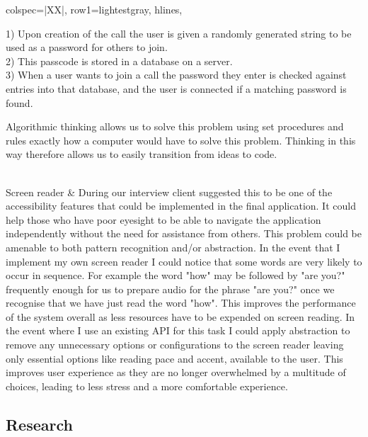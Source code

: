\begin{longtblr}[
  caption={Features and their justifications},
  label={tblr:features}
]{
  colspec={|XX|},
  row{1}={lightestgray},
  hlines,
}
{  \vspace{0.2cm}
  1) Upon creation of the call the user is given a randomly 
  generated string to be used as a password for others to 
  join.\\

  2) This passcode is stored in a database on a server.\\

  3) When a user wants to join a call the password they enter 
  is checked against entries into that database, and the user
  is connected if a matching password is found.\\
  \vspace{0.2cm}

  Algorithmic thinking allows us to solve this problem using 
  set procedures and rules exactly how a computer would have to  solve this problem. Thinking in this way therefore allows us
  to easily transition from ideas to code.}\\

  Screen reader & {During our interview client suggested this
  to be one of the accessibility features that could be
  implemented in the final application. It could help those 
  who have poor eyesight to be able to navigate the application
  independently without the need for assistance from others. 
  This problem could be amenable to both pattern recognition 
  and/or abstraction. In the event that I implement my own 
  screen reader I could notice that some words are very likely
  to occur in sequence. For example the word "how" may be 
  followed by "are you?" frequently enough for us to prepare 
  audio for the phrase "are you?" once we recognise that we 
  have just read the word "how". This improves the performance
  of the system overall as less resources have to be expended
  on screen reading. In the event where I use an
  existing API for this task I could apply abstraction to 
  remove any unnecessary options or configurations to the 
  screen reader leaving only essential options like reading 
  pace and accent, available to the user. This improves user
  experience as they are no longer overwhelmed by a multitude
  of choices, leading to less stress and a more comfortable 
  experience. \cite{overchoice}}

\end{longtblr}

\subsection{Research}
